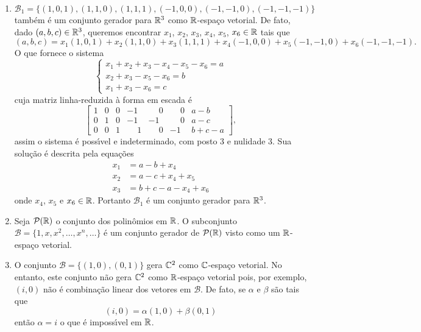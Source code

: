 \begin{exemplo}
\begin{enumerate}[label={\arabic*})]
	\[
		(a, b, c) = a(1, 0, 0) + b(0, 1, 0) + c(0, 0, 1).
	\]
	Assim qualquer vetor de $\real^3$ \'e uma combina\c{c}\~ao linear dos vetores $(1, 0 , 0)$, $(0, 1 , 0)$ e $(0, 0 , 1)$. Logo o conjunto $\mathcal{B} = \{(1, 0 , 0), (0, 1 , 0), (0, 0 , 1)\}$ \'e um conjunto gerador para $\real^3$.
	\item $\mathcal{B}_1 = \{(1, 0 , 1), (1, 1 , 0), (1, 1 , 1), (-1, 0, 0), (-1, -1, 0), (-1, -1, -1)\}$ tamb\'em \'e um conjunto gerador para $\real^3$ como $\mathbb{R}$-espa\c{c}o vetorial. De fato, dado $(a, b, c) \in \mathbb{R}^3$, queremos encontrar $x_1$, $x_2$, $x_3$, $x_4$, $x_5$, $x_6 \in \mathbb{R}$ tais que
	\[
		(a, b, c) = x_1(1, 0 , 1) + x_2(1, 1 , 0) + x_3(1, 1 , 1) + x_4(-1, 0, 0) + x_5(-1, -1, 0) + x_6(-1, -1, -1).
	\]
	O que fornece o sistema
	\[
		\begin{cases}
			x_1 + x_2 + x_3 - x_4 - x_5 - x_6 = a\\
			x_2 + x_3 - x_5 - x_6 = b\\
			x_1 + x_3 - x_6 = c
		\end{cases}
	\]
	cuja matriz linha-reduzida \`a forma em escada \'e
	\[
		\begin{bmatrix}
			1 & 0 & 0 & -1 & \phantom{-}0 & \phantom{-}0 & a - b\\
			0 & 1 & 0 & -1 & -1 & \phantom{-}0 & a - c\\
			0 & 0 & 1 & \phantom{-}1 & \phantom{-}0 & -1 & b + c - a
		\end{bmatrix},
	\]
	assim o sistema \'e poss{\'\i}vel e indeterminado, com posto 3 e nulidade 3. Sua solu\c{c}\~ao \'e descrita pela equa\c{c}\~oes
	\begin{align*}
		x_1 &= a - b + x_4\\
		x_2 &= a - c + x_4 + x_5\\
		x_3 &= b + c - a - x_4 + x_6
	\end{align*}
	onde $x_4$, $x_5$ e $x_6 \in \mathbb{R}$. Portanto $\mathcal{B}_1$ \'e um conjunto gerador para $\real^3$.
	\item Seja $\mathcal{P}(\mathbb{R})$ o conjunto dos polin\^omios em $\mathbb{R}$. O subconjunto $\mathcal{B} = \{1, x, x^2, \dots, x^n, \dots\}$ \'e um conjunto gerador de $\mathcal{P}(\mathbb{R})$ visto como um $\mathbb{R}$-espa\c{c}o vetorial.
	\item O conjunto $\mathcal{B} = \{(1, 0), (0, 1)\}$ gera $\mathbb{C}^2$ como $\mathbb{C}$-espa\c{c}o vetorial. No entanto, este conjunto n\~ao gera $\mathbb{C}^2$ como $\mathbb{R}$-espa\c{c}o vetorial pois, por exemplo, $(i, 0)$ n\~ao \'e combina\c{c}\~ao linear dos vetores em $\mathcal{B}$. De fato, se $\alpha$ e $\beta$ s\~ao tais que
	\[
		(i, 0) = \alpha (1, 0) + \beta (0, 1)
	\]
	ent\~ao $\alpha = i$ o que \'e imposs{\'\i}vel em $\mathbb{R}$.
	\end{enumerate}
\end{exemplo}

